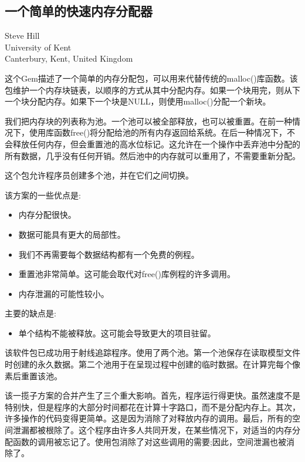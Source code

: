 \begin{CJK}{UTF8}{gbsn}
\section{一个简单的快速内存分配器}
\begin{center}
\small{
Steve Hill\\
University of Kent\\
Canterbury, Kent, United Kingdom}
\end{center}

这个Gem描述了一个简单的内存分配包，可以用来代替传统的malloc()库函数。该包维护一个内存块链表，以顺序的方式从其中分配内存。如果一个块用完，则从下一个块分配内存。如果下一个块是NULL，则使用malloc()分配一个新块。


我们把内存块的列表称为池。一个池可以被全部释放，也可以被重置。在前一种情况下，使用库函数free()将分配给池的所有内存返回给系统。在后一种情况下，不会释放任何内存，但会重置池的高水位标记。这允许在一个操作中丢弃池中分配的所有数据，几乎没有任何开销。然后池中的内存就可以重用了，不需要重新分配。


这个包允许程序员创建多个池，并在它们之间切换。


该方案的一些优点是:



\begin{itemize}
	\item 内存分配很快。


\item 数据可能具有更大的局部性。


\item 我们不再需要每个数据结构都有一个免费的例程。


\item 重置池非常简单。这可能会取代对free()库例程的许多调用。


\item 内存泄漏的可能性较小。

\end{itemize}

主要的缺点是:

\begin{itemize}
  \item 单个结构不能被释放。这可能会导致更大的项目驻留。
\end{itemize}


该软件包已成功用于射线追踪程序。使用了两个池。第一个池保存在读取模型文件时创建的永久数据。第二个池用于在呈现过程中创建的临时数据。在计算完每个像素后重置该池。


该一揽子方案的合并产生了三个重大影响。首先，程序运行得更快。虽然速度不是特别快，但是程序的大部分时间都花在计算十字路口，而不是分配内存上。其次，许多操作的代码变得更简单。这是因为消除了对释放内存的调用。最后，所有的空间泄漏都被根除了。这个程序由许多人共同开发，在某些情况下，对适当的内存分配函数的调用被忘记了。使用包消除了对这些调用的需要;因此，空间泄漏也被消除了。


\end{CJK}
